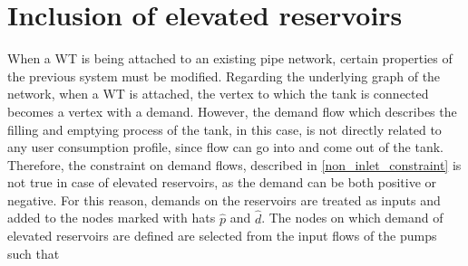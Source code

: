 \newpage

\section{Inclusion of elevated reservoirs}
\label{inclusion_of_reservoirs}

When a WT is being attached to an existing pipe network, certain properties of the previous system must be modified. Regarding the underlying graph of the network, when a WT is attached, the vertex to which the tank is connected becomes a vertex with a demand. However, the demand flow which describes the filling and emptying process of the tank, in this case, is not directly related to any user consumption profile, since flow can go into and come out of the tank. Therefore, the constraint on demand flows, described in \eqref{non_inlet_constraint} is not true in case of elevated reservoirs, as the demand can be both positive or negative. For this reason, demands on the reservoirs are treated as inputs and added to the nodes marked with hats $\hat{p}$ and $\hat{d}$. The nodes on which demand of elevated reservoirs are defined are selected from the input flows of the pumps such that 

